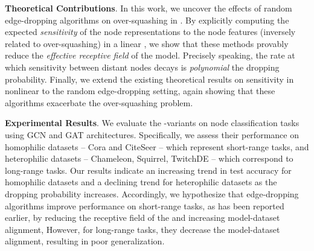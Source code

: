 \textbf{Theoretical Contributions}. In this work, we uncover the effects of random edge-dropping algorithms on over-squashing in . By explicitly computing the expected \textit{sensitivity} of the node representations to the node features \citep{topping2022understanding} (inversely related to over-squashing) in a linear  \cite{kipf2017gcn}, we show that these methods provably reduce the \textit{effective receptive field} of the model. Precisely speaking, the rate at which sensitivity between distant nodes decays is \emph{polynomial} \wrt the dropping probability. Finally, we extend the existing theoretical results on sensitivity in nonlinear  \cite{black2023resistance,di2023over,xu2018jknet} to the random edge-dropping setting, again showing that these algorithms exacerbate the over-squashing problem. %

\textbf{Experimental Results}. We evaluate the -variants on node classification tasks using GCN and GAT \cite{veličković2018gat} architectures. Specifically, we assess their performance on homophilic datasets -- Cora \cite{mccallum2000cora} and CiteSeer \cite{giles1998citeseer} -- which represent short-range tasks, and heterophilic datasets -- Chameleon, Squirrel, TwitchDE \cite{musae} -- which correspond to long-range tasks. Our results indicate an increasing trend in test accuracy for homophilic datasets and a declining trend for heterophilic datasets as the dropping probability increases. Accordingly, we hypothesize that edge-dropping algorithms improve performance on short-range tasks, as has been reported earlier, by reducing the receptive field of the  and increasing model-dataset alignment, However, for long-range tasks, they decrease the model-dataset alignment, resulting in poor generalization.